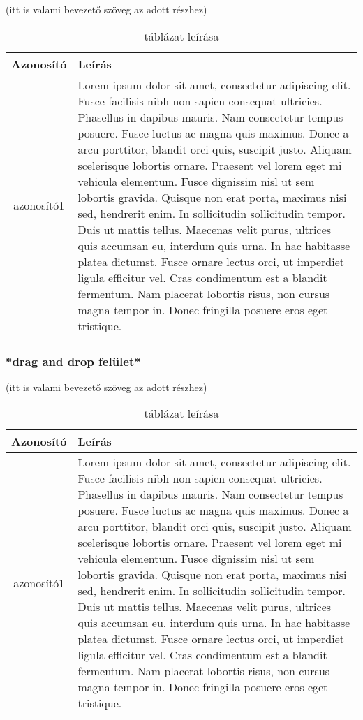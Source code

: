 \documentclass{article}
\begin{document}
(itt is valami bevezető szöveg az adott részhez)

\begin{table}[htbp]
\centering
\begin{tabular}{|c|p{14cm}|}
\hline
\textbf{Azonosító} & \textbf{Leírás}        \\ 
\hline
       azonosító1  & Lorem ipsum dolor sit amet, consectetur adipiscing elit. Fusce facilisis nibh non sapien consequat ultricies. Phasellus in dapibus mauris. Nam consectetur tempus posuere. Fusce luctus ac magna quis maximus. Donec a arcu porttitor, blandit orci quis, suscipit justo. Aliquam scelerisque lobortis ornare. Praesent vel lorem eget mi vehicula elementum. Fusce dignissim nisl ut sem lobortis gravida. Quisque non erat porta, maximus nisi sed, hendrerit enim. In sollicitudin sollicitudin tempor. Duis ut mattis tellus. Maecenas velit purus, ultrices quis accumsan eu, interdum quis urna. In hac habitasse platea dictumst. Fusce ornare lectus orci, ut imperdiet ligula efficitur vel. Cras condimentum est a blandit fermentum. Nam placerat lobortis risus, non cursus magna tempor in. Donec fringilla posuere eros eget tristique. \\
\hline
\end{tabular}
\caption{táblázat leírása}
\label{table:my_label}
\end{table}

\subsubsection{*drag and drop felület*}

(itt is valami bevezető szöveg az adott részhez)

\begin{table}[htbp]
\centering
\begin{tabular}{|c|p{14cm}|}
\hline
\textbf{Azonosító} & \textbf{Leírás}        \\ 
\hline
       azonosító1  & Lorem ipsum dolor sit amet, consectetur adipiscing elit. Fusce facilisis nibh non sapien consequat ultricies. Phasellus in dapibus mauris. Nam consectetur tempus posuere. Fusce luctus ac magna quis maximus. Donec a arcu porttitor, blandit orci quis, suscipit justo. Aliquam scelerisque lobortis ornare. Praesent vel lorem eget mi vehicula elementum. Fusce dignissim nisl ut sem lobortis gravida. Quisque non erat porta, maximus nisi sed, hendrerit enim. In sollicitudin sollicitudin tempor. Duis ut mattis tellus. Maecenas velit purus, ultrices quis accumsan eu, interdum quis urna. In hac habitasse platea dictumst. Fusce ornare lectus orci, ut imperdiet ligula efficitur vel. Cras condimentum est a blandit fermentum. Nam placerat lobortis risus, non cursus magna tempor in. Donec fringilla posuere eros eget tristique. \\
\hline
\end{tabular}
\caption{táblázat leírása}
\label{table:my_label}
\end{table}
\end{document}
